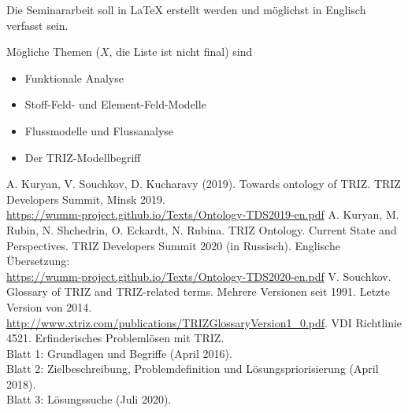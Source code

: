 \documentclass[11pt,a4paper]{article}
\begin{document}
Die Seminararbeit soll in {\LaTeX} erstellt werden und möglichst in Englisch
verfasst sein.

Mögliche Themen ($X$, die Liste ist nicht final) sind
\begin{itemize}
\item Funktionale Analyse
\item Stoff-Feld- und Element-Feld-Modelle
\item Flussmodelle und Flussanalyse
\item Der TRIZ-Modellbegriff
\end{itemize}

\begin{thebibliography}{xxx}
 A. Kuryan, V. Souchkov, D. Kucharavy (2019). Towards
  ontology of TRIZ. TRIZ Developers Summit, Minsk 2019.
  \\ \url{https://wumm-project.github.io/Texts/Ontology-TDS2019-en.pdf}
 A. Kuryan, M. Rubin, N. Shchedrin, O. Eckardt, N. Rubina.
  TRIZ Ontology. Current State and Perspectives. TRIZ Developers Summit 2020
  (in Russisch). Englische Übersetzung:
  \\ \url{https://wumm-project.github.io/Texts/Ontology-TDS2020-en.pdf}
 V. Souchkov. Glossary of TRIZ and TRIZ-related terms. Mehrere
  Versionen seit 1991. Letzte Version von 2014.
  \\ \url{http://www.xtriz.com/publications/TRIZGlossaryVersion1_0.pdf}.
 VDI Richtlinie 4521. Erfinderisches Problemlösen mit TRIZ.\\
  Blatt 1: Grundlagen und Begriffe (April 2016).\\ Blatt 2: Zielbeschreibung,
  Problemdefinition und Lösungspriorisierung (April 2018).\\ Blatt 3:
  Lösungssuche (Juli 2020). 
\end{thebibliography}
\end{document}
